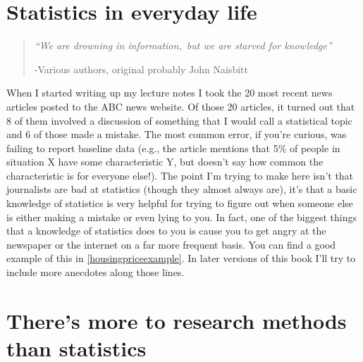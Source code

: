 \documentclass[
]{book}
\begin{document}
\hypertarget{statistics-in-everyday-life}{%
\section{Statistics in everyday life}\label{statistics-in-everyday-life}}

\begin{quote}
\emph{``We are drowning in information,~but we are starved for knowledge''}

-Various authors, original probably John Naisbitt
\end{quote}

When I started writing up my lecture notes I took the 20 most recent news articles posted to the ABC news website. Of those 20 articles, it turned out that 8 of them involved a discussion of something that I would call a statistical topic and 6 of those made a mistake. The most common error, if you're curious, was failing to report baseline data (e.g., the article mentions that 5\% of people in situation X have some characteristic Y, but doesn't say how common the characteristic is for everyone else!). The point I'm trying to make here isn't that journalists are bad at statistics (though they almost always are), it's that a basic knowledge of statistics is very helpful for trying to figure out when someone else is either making a mistake or even lying to you. In fact, one of the biggest things that a knowledge of statistics does to you is cause you to get angry at the newspaper or the internet on a far more frequent basis. You can find a good example of this in \ref{housingpriceexample}. In later versions of this book I'll try to include more anecdotes along those lines.

\hypertarget{theres-more-to-research-methods-than-statistics}{%
\section{There's more to research methods than statistics}\label{theres-more-to-research-methods-than-statistics}}
\end{document}
